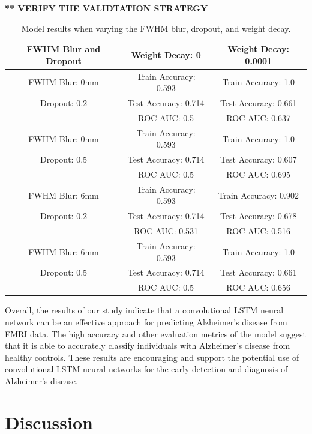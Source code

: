 \documentclass[10pt]{article}
\begin{document}
	\textbf{** VERIFY THE VALIDTATION STRATEGY}

	\begin{table}[!ht]
		\centering
		\begin{tabular}{|| c | c | c ||} 
			\hline
			FWHM Blur and Dropout & Weight Decay: 0 & Weight Decay: 0.0001 \\ [0.5ex] 
			\hline\hline
			FWHM Blur: 0mm & Train Accuracy: 0.593 & Train Accuracy: 1.0 \\
			Dropout: 0.2 & Test Accuracy: 0.714 & Test Accuracy: 0.661 \\
			 & ROC AUC: 0.5 & ROC AUC: 0.637 \\
			\hline
			FWHM Blur: 0mm & Train Accuracy: 0.593 & Train Accuracy: 1.0 \\
			Dropout: 0.5 & Test Accuracy: 0.714 & Test Accuracy: 0.607 \\
			 & ROC AUC: 0.5 & ROC AUC: 0.695 \\
			\hline
			FWHM Blur: 6mm & Train Accuracy: 0.593 & Train Accuracy: 0.902 \\
			Dropout: 0.2 & Test Accuracy: 0.714 & Test Accuracy: 0.678 \\
			 & ROC AUC: 0.531 & ROC AUC: 0.516 \\
			\hline
			FWHM Blur: 6mm & Train Accuracy: 0.593 & Train Accuracy: 1.0 \\
			Dropout: 0.5 & Test Accuracy: 0.714 & Test Accuracy: 0.661 \\
			 & ROC AUC: 0.5 & ROC AUC: 0.656 \\
			\hline
		\end{tabular}
		\caption{Model results when varying the FWHM blur, dropout, and weight decay.}
		\label{tab:performance}
	\end{table}

	Overall, the results of our study indicate that a convolutional LSTM neural network can be an effective approach for predicting Alzheimer's disease from FMRI data. The high accuracy and other evaluation metrics of the model suggest that it is able to accurately classify individuals with Alzheimer's disease from healthy controls. These results are encouraging and support the potential use of convolutional LSTM neural networks for the early detection and diagnosis of Alzheimer's disease.

	\section{Discussion}
\end{document}
